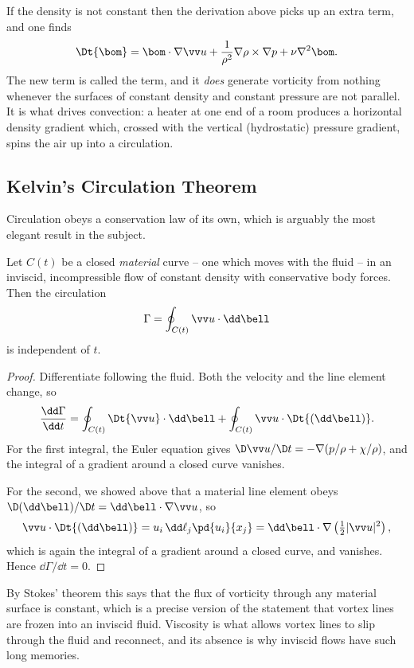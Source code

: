 \begin{remark}
	If the density is not constant then the derivation above picks up an extra term, and one finds
	$$
	\Dt{\bom} = \bom \cdot \nabla \vv u + \frac{1}{\rho^2}\nabla \rho \times \nabla p + \nu \nabla^2 \bom.
	$$
	The new term is called the  term, and it \emph{does} generate vorticity from nothing whenever the surfaces of constant density and constant pressure are not parallel. It is what drives convection: a heater at one end of a room produces a horizontal density gradient which, crossed with the vertical (hydrostatic) pressure gradient, spins the air up into a circulation.
\end{remark}

\subsection{Kelvin's Circulation Theorem}

Circulation obeys a conservation law of its own, which is arguably the most elegant result in the subject.

\begin{theorem}
	Let $C(t)$ be a closed \emph{material} curve -- one which moves with the fluid -- in an inviscid, incompressible flow of constant density with conservative body forces. Then the circulation
	$$
	\Gamma = \oint_{C(t)} \vv u \cdot \dd \bell
	$$
	is independent of $t$.
\end{theorem}
\begin{proof}
	Differentiate following the fluid. Both the velocity and the line element change, so
	$$
	\frac{\dd \Gamma}{\dd t} = \oint_{C(t)} \Dt{\vv u}\cdot \dd \bell + \oint_{C(t)} \vv u \cdot \Dt{(\dd \bell)}.
	$$
	For the first integral, the Euler equation gives $\D \vv u/\D t = -\nabla(p/\rho + \chi/\rho)$, and the integral of a gradient around a closed curve vanishes.

	For the second, we showed above that a material line element obeys $\D(\dd\bell)/\D t = \dd \bell \cdot \nabla \vv u$, so
	$$
	\vv u \cdot \Dt{(\dd\bell)} = u_i \, \dd \ell_j \pd{u_i}{x_j} = \dd \bell \cdot \nabla \left(\tfrac{1}{2}|\vv u|^2\right),
	$$
	which is again the integral of a gradient around a closed curve, and vanishes. Hence $\dd\Gamma/\dd t = 0$. \qedhere
\end{proof}

By Stokes' theorem this says that the flux of vorticity through any material surface is constant, which is a precise version of the statement that vortex lines are frozen into an inviscid fluid. Viscosity is what allows vortex lines to slip through the fluid and reconnect, and its absence is why inviscid flows have such long memories.

